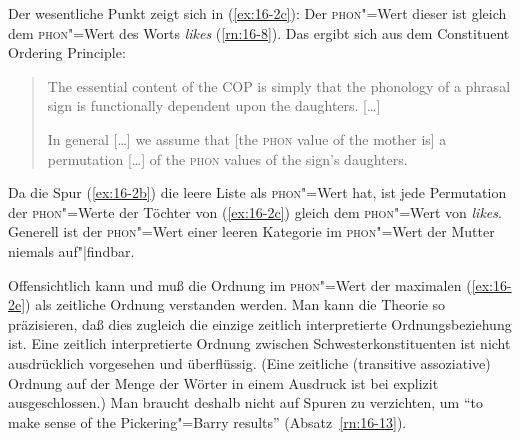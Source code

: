 \documentclass[output=paper]{LSP/langsci}
\begin{document}
\addlines[2]
{\randnum}Der wesentliche Punkt zeigt sich in (\ref{ex:16-2c}): Der
\textsc{phon}"=Wert dieser  ist gleich dem \textsc{phon}"=Wert des Worts \textit{likes}
(\ref{rn:16-8}). Das ergibt sich aus dem Constituent Ordering Principle:
\begin{quotation}
  The essential content of the COP is simply that the phonology of a
  phrasal sign is functionally dependent upon the daughters. [\ldots{}]

  In general [\ldots{}] we assume that [the \textsc{phon} value of the mother is] a
  permutation [\ldots{}] of the \textsc{phon} values of the sign's daughters.
\citep[169]{PollardSag1987}
\end{quotation}
{\randnum}Da die Spur (\ref{ex:16-2b}) die leere Liste als
\textsc{phon}"=Wert hat, ist jede Permutation der \textsc{phon}"=Werte
der Töchter von (\ref{ex:16-2c}) gleich dem \textsc{phon}"=Wert von \textit{likes}. Generell
ist der \textsc{phon}"=Wert einer leeren Kategorie im
\textsc{phon}"=Wert der Mutter niemals auf"|findbar.

{\randnum}Offensichtlich kann und muß die Ordnung im
\textsc{phon}"=Wert der maximalen  (\ref{ex:16-2e}) als zeitliche
Ordnung verstanden werden. Man kann die Theorie so präzisieren, daß
dies zugleich die einzige zeitlich interpretierte Ordnungsbeziehung
ist. Eine zeitlich interpretierte Ordnung zwischen
Schwesterkonstituenten ist nicht ausdrücklich vorgesehen und
überflüssig. (Eine zeitliche (transitive assoziative) Ordnung auf
der Menge der Wörter in einem Ausdruck ist bei \citealt{Pollardetal1994b} explizit ausgeschlossen.)
Man braucht deshalb nicht auf Spuren zu verzichten, um "`to make sense of the Pickering"=Barry results"'
(Absatz~\ref{rn:16-13}).
\end{document}
